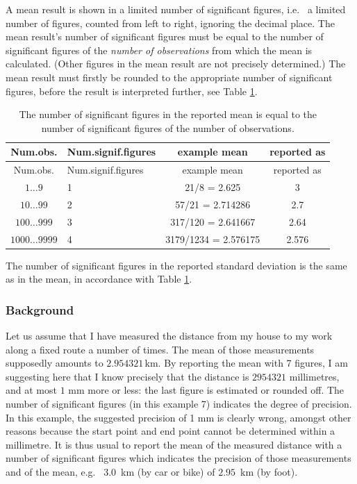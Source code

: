 \documentclass[
]{book}
\begin{document}
A mean result is shown in a limited number of significant figures, i.e.~
a limited number of figures, counted from left to right, ignoring the decimal place.
The mean result's number of significant figures must be equal to the
number of significant figures of the \emph{number of observations} from which the
mean is calculated. (Other figures in the mean result are not precisely
determined.) The mean result must firstly be rounded to the
appropriate number of significant figures, before the result is interpreted
further, see
Table \ref{tab:signiffiguresmean}.

\begin{longtable}[]{@{}clcc@{}}
\caption{\label{tab:signiffiguresmean} The number of significant figures in the reported mean is
equal to the number of significant figures of the number of observations.}\tabularnewline
\toprule
Num.obs. & Num.signif.figures & example mean & reported as \\
\midrule
\endfirsthead
\toprule
Num.obs. & Num.signif.figures & example mean & reported as \\
\midrule
\endhead
\(1\dots9\) & 1 & 21/8 = 2.625 & 3 \\
\(10\dots99\) & 2 & 57/21 = 2.714286 & 2.7 \\
\(100\dots999\) & 3 & 317/120 = 2.641667 & 2.64 \\
\(1000\dots9999\) & 4 & 3179/1234 = 2.576175 & 2.576 \\
\bottomrule
\end{longtable}

The number of significant figures in the reported standard deviation is
the same as in the mean, in accordance with
Table \ref{tab:signiffiguresmean}.

\hypertarget{background}{%
\subsubsection{Background}\label{background}}

Let us assume that I have measured the distance from my house to my work
along a fixed route a number of times. The mean of those measurements
supposedly amounts to \(2.954321\) km. By reporting the mean with 7 figures,
I am suggesting here that I know precisely that the distance is \(2954321\) millimetres,
and at most \(1\) mm more or less:
the last figure is estimated or rounded off. The number of significant figures
(in this example 7) indicates the degree of precision. In this example, the
suggested precision of 1 mm is clearly
wrong, amongst other reasons because the start point and end point cannot be determined
within a millimetre. It is thus usual to report the mean of the measured
distance with a number of significant figures which indicates the precision
of those measurements and of the mean, e.g.~
\(3.0\)~km (by car or bike) of \(2.95\)~km (by foot).
\end{document}
